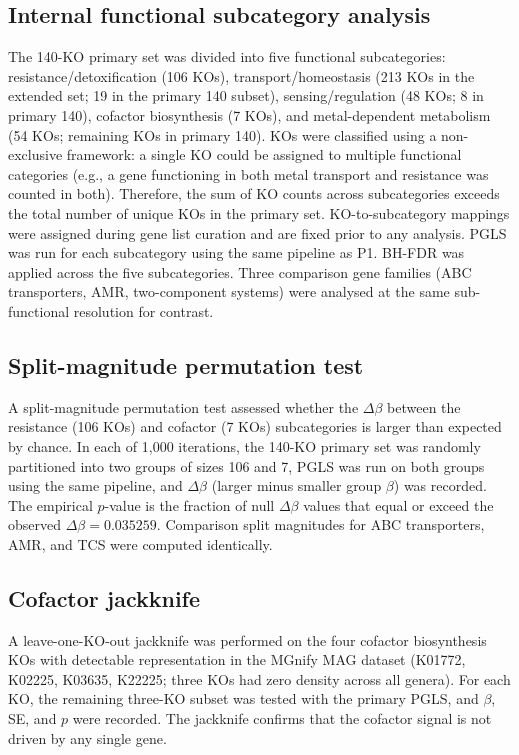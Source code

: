 \documentclass[times]{zHenriquesLab-StyleBioRxiv}
\begin{document}
\subsection{Internal functional subcategory analysis}

The 140-KO primary set was divided into five functional subcategories:
resistance/detoxification (106 KOs), transport/homeostasis (213 KOs in the
extended set; 19 in the primary 140 subset), sensing/regulation (48 KOs; 8 in
primary 140), cofactor biosynthesis (7 KOs), and metal-dependent metabolism
(54 KOs; remaining KOs in primary 140). KOs were classified using a non-exclusive
framework: a single KO could be assigned to multiple functional categories (e.g.,
a gene functioning in both metal transport and resistance was counted in both).
Therefore, the sum of KO counts across subcategories exceeds the total number of
unique KOs in the primary set. KO-to-subcategory mappings were
assigned during gene list curation and are fixed prior to any analysis. PGLS
was run for each subcategory using the same pipeline as P1. BH-FDR was applied
across the five subcategories. Three comparison gene families (ABC transporters,
AMR, two-component systems) were analysed at the same sub-functional resolution
for contrast.

\subsection{Split-magnitude permutation test}

A split-magnitude permutation test assessed whether the $\Delta\beta$ between
the resistance (106 KOs) and cofactor (7 KOs) subcategories is larger than
expected by chance. In each of 1,000 iterations, the 140-KO primary set was
randomly partitioned into two groups of sizes 106 and 7, PGLS was run on both
groups using the same pipeline, and $\Delta\beta$ (larger minus smaller group
$\beta$) was recorded. The empirical $p$-value is the fraction of null
$\Delta\beta$ values that equal or exceed the observed $\Delta\beta =
0.035259$. Comparison split magnitudes for ABC transporters, AMR, and TCS were
computed identically.

\subsection{Cofactor jackknife}

A leave-one-KO-out jackknife was performed on the four cofactor biosynthesis
KOs with detectable representation in the MGnify MAG dataset (K01772, K02225,
K03635, K22225; three KOs had zero density across all genera). For each KO, the
remaining three-KO subset was tested with the primary PGLS, and $\beta$, SE,
and $p$ were recorded. The jackknife confirms that the cofactor signal is not
driven by any single gene.
\end{document}
